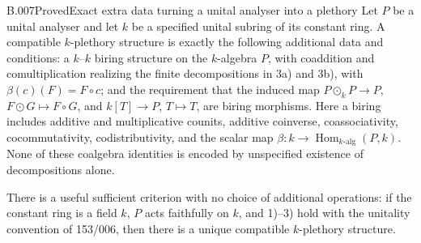 \begin{saresult}{B.007}{Proved}{Exact extra data turning a unital analyser into a plethory}
Let $P$ be a unital analyser and let $k$ be a specified unital subring
of its constant ring. A compatible $k$-plethory structure is exactly
the following additional data and conditions: a $k$--$k$ biring
structure on the $k$-algebra $P$, with coaddition and comultiplication
realizing the finite decompositions in 3a) and 3b), with
$\beta(c)(F)=F\circ c$; and the requirement that the induced map
$P\odot_k P\longrightarrow P$, $F\odot G\longmapsto F\circ G$,
and $k[T]\longrightarrow P$, $T\longmapsto T$, are biring morphisms.
Here a biring includes additive and multiplicative counits, additive
coinverse, coassociativity, cocommutativity, codistributivity, and the
scalar map $\beta:k\longrightarrow\operatorname{Hom}_{k\text{-alg}}(P,k)$.
None of these coalgebra identities is encoded by unspecified
existence of decompositions alone.

There is a useful sufficient criterion with no choice of additional
operations: if the constant ring is a field $k$, $P$ acts faithfully
on $k$, and 1)--3) hold with the unitality convention of 153/006,
then there is a unique compatible $k$-plethory structure.
\end{saresult}
